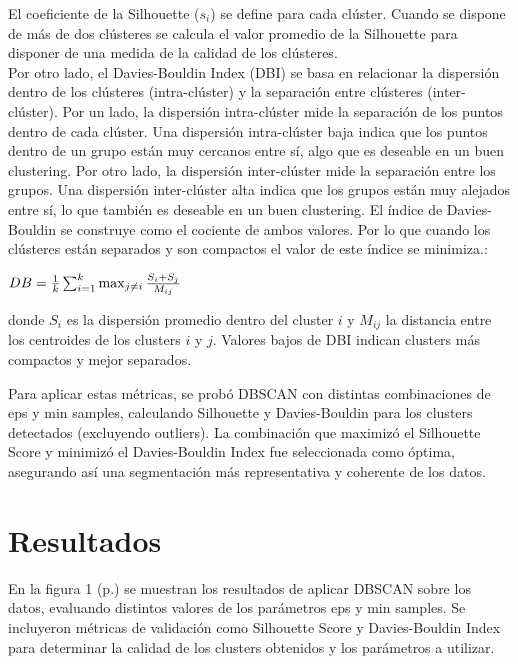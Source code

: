 \documentclass{article}
\begin{document}
El coeficiente de la Silhouette ($s_i$) se define para cada clúster. Cuando se dispone de más de dos clústeres se calcula el valor promedio de la Silhouette para disponer de una medida de la calidad de los clústeres.\\

Por otro lado, el Davies-Bouldin Index (DBI) \cite{Davies_Bouldinen} se basa en relacionar la dispersión dentro de los clústeres (intra-clúster) y la separación entre clústeres (inter-clúster). Por un lado, la dispersión intra-clúster mide la separación de los puntos dentro de cada clúster. Una dispersión intra-clúster baja indica que los puntos dentro de un grupo están muy cercanos entre sí, algo que es deseable en un buen clustering. Por otro lado, la dispersión inter-clúster mide la separación entre los grupos. Una dispersión inter-clúster alta indica que los grupos están muy alejados entre sí, lo que también es deseable en un buen clustering. El índice de Davies-Bouldin se construye como el cociente de ambos valores. Por lo que cuando los clústeres están separados y son compactos el valor de este índice se minimiza.:


\begin{math}
DB=\frac{1}{k} \sum_{i=1}^{k} \max_{j \neq i} \frac{S_i+S_j}{M_{ij}} \\
\end{math}

donde $S_i$ es la dispersión promedio dentro del cluster $i$ y $M_{ij}$ la distancia entre los centroides de los clusters $i$ y $j$. Valores bajos de DBI indican clusters más compactos y mejor separados.

Para aplicar estas métricas, se probó DBSCAN con distintas combinaciones de eps y min samples, calculando Silhouette y Davies-Bouldin para los clusters detectados (excluyendo outliers). La combinación que maximizó el Silhouette Score y minimizó el Davies-Bouldin Index fue seleccionada como óptima, asegurando así una segmentación más representativa y coherente de los datos.

\section{Resultados}

En la figura 1 (p.\pageref{fig:resultado}) se muestran los resultados de aplicar DBSCAN sobre los datos, evaluando distintos valores de los parámetros eps y min samples. Se incluyeron métricas de validación  como Silhouette Score y Davies-Bouldin Index para determinar la calidad de los clusters obtenidos y los parámetros a utilizar.
\end{document}
